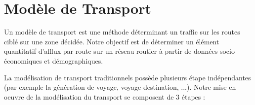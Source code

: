 

\section{Modèle de Transport}



Un modèle de transport est une méthode déterminant un traffic sur les routes ciblé sur une zone décidée. Notre objectif est de déterminer un élément quantitatif d'afflux par route sur un réseau routier à partir de données socio-économiques et démographiques.

La modélisation de transport traditionnels possède plusieurs étape indépendantes (par exemple la génération de voyage, voyage destination, ...). Notre mise en oeuvre de la modélisation du transport se composent de 3 étapes :


